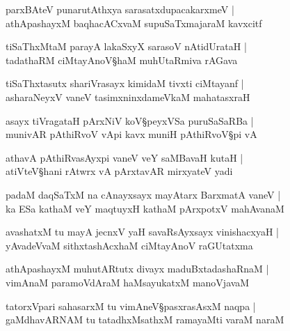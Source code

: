 \begin{shloka}
parxBAteV punarutAthxya sarasatxdupacakarxmeV |\\
athApashayxM baqhacACxvaM supuSaTxmajaraM kavxcitf
\end{shloka}

\begin{shloka}
tiSaThxMtaM parayA lakaSxyX sarasoV nAtidUrataH |\\
tadathaRM ciMtayAnoV\S haM muhUtaRmiva rAGava
\end{shloka}

\begin{shloka}
tiSaThxtasutx shariVrasayx kimidaM tivxti ciMtayanf |\\
asharaNeyxV vaneV tasimxninxdameVkaM mahatasxraH
\end{shloka}

\begin{shloka}
asayx tiVragataH pArxNiV koV\S peyxVSa puruSaSaRBa |\\
munivAR pAthiRvoV vApi kavx muniH pAthiRvoV\S pi vA 
\end{shloka}

\begin{shloka}
athavA pAthiRvasAyxpi vaneV veY saMBavaH kutaH |\\
atiVteV\S hani rAtwrx vA pArxtavAR mirxyateV yadi 
\end{shloka}

\begin{shloka}
padaM daqSaTxM na cAnayxsayx mayAtarx BarxmatA vaneV |\\
ka ESa kathaM veY maqtuyxH kathaM pArxpotxV mahAvanaM 
\end{shloka}

\begin{shloka}
avashatxM tu mayA jecnxV yaH savaRsAyxsayx vinishacxyaH |\\
yAvadeVvaM sithxtashAcxhaM ciMtayAnoV raGUtatxma
\end{shloka}

\begin{shloka}
athApashayxM muhutARtutx divayx maduBxtadashaRnaM |\\
vimAnaM paramoVdAraM haMsayukatxM manoVjavaM 
\end{shloka}

\begin{shloka}
tatorxVpari sahasarxM tu vimAneV\S pasxrasAsxM naqpa |\\
gaMdhavARNAM tu tatadhxMsathxM ramayaMti varaM naraM 
\end{shloka}

